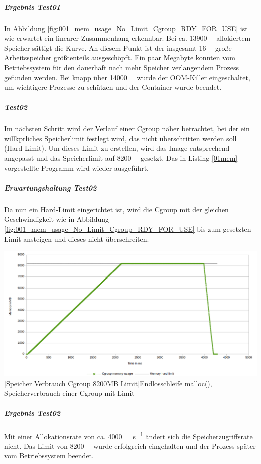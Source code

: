 \subparagraph{Ergebnis Test01}
In Abbildung \ref{fig:001_mem_usage_No_Limit_Cgroup_RDY_FOR_USE} ist wie erwartet ein linearer Zusammenhang erkennbar. Bei ca. \SI{13900}{\mega\byte} allokiertem Speicher sättigt die Kurve. An diesem Punkt ist der insgesamt \SI{16}{\giga\byte} große Arbeitsspeicher größtenteils ausgeschöpft. Ein paar Megabyte konnten vom Betriebssystem für den dauerhaft nach mehr Speicher verlangendem Prozess gefunden werden. Bei knapp über \SI{14000}{\mega\byte} wurde der OOM-Killer eingeschaltet, um wichtigere Prozesse zu schützen und der Container wurde beendet.

\subparagraph{Test02}
Im nächsten Schritt wird der Verlauf einer Cgroup näher betrachtet, bei der ein willkprliches Speicherlimit festlegt wird, das nicht überschritten werden soll (Hard-Limit). Um dieses Limit zu erstellen, wird das Image entsprechend angepasst und das Speicherlimit auf \SI{8200}{\mega\byte} gesetzt. Das in Listing \ref{01mem} vorgestellte Programm wird wieder ausgeführt.

\subparagraph{Erwartungshaltung Test02}
Da nun ein Hard-Limit eingerichtet ist, wird die Cgroup mit der gleichen Geschwindigkeit wie in Abbildung \ref{fig:001_mem_usage_No_Limit_Cgroup_RDY_FOR_USE} bis zum gesetzten Limit ansteigen und dieses nicht überschreiten. 

\vspace{1em}
\begin{minipage}{\linewidth}
	\centering
	\includegraphics[width=1\linewidth]{pics/002_mem_usage_8200mb_limit_Cgroup_RDY_FOR_USE.png}
	[Speicher Verbrauch Cgroup 8200MB Limit]{Endlosschleife malloc(), Speicherverbrauch einer Cgroup mit Limit}
	\label{fig:002_mem_usage_8200mb_limit_Cgroup_RDY_FOR_USE}
\end{minipage}

\subparagraph{Ergebnis Test02}
Mit einer Allokationsrate von ca. \SI{4000}{\mega\byte\per\second} ändert sich die Speicherzugriffsrate nicht. Das Limit von \SI{8200}{\mega\byte} wurde erfolgreich eingehalten und der Prozess später vom Betriebssystem beendet.

